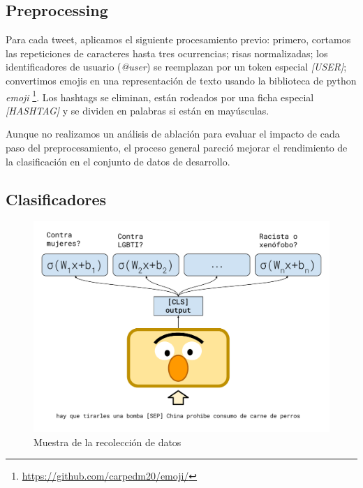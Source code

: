 \subsection{Preprocessing}

Para cada tweet, aplicamos el siguiente procesamiento previo: primero, cortamos las repeticiones de caracteres hasta tres ocurrencias; risas normalizadas; los identificadores de usuario (\emph{@user}) se reemplazan por un token especial \emph{[USER]}; convertimos emojis en una representación de texto usando la biblioteca de python \emph{emoji} \footnote {\url{https://github.com/carpedm20/emoji/}}. Los hashtags se eliminan, están rodeados por una ficha especial \emph{[HASHTAG]} y se dividen en palabras si están en mayúsculas.

Aunque no realizamos un análisis de ablación para evaluar el impacto de cada paso del preprocesamiento, el proceso general pareció mejorar el rendimiento de la clasificación en el conjunto de datos de desarrollo.

\subsection{Clasificadores}
\label{sec:contextualized_classifiers}


\begin{figure}
    \centering
    \includegraphics[width=\textwidth]{img/bert_multioutput.pdf}
    \caption{Muestra de la recolección de datos}
    \label{fig:bert_classifier}
\end{figure}


